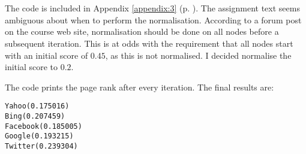 
\section{}

The code is included in Appendix \ref{appendix:3} (p. \pageref{appendix:3}).
The assignment text seems ambiguous about when to perform the normalisation.
According to a forum post on the course web site\footnotemark, normalisation
should be done on all nodes before a subsequent iteration. This is at odds with
the requirement that all nodes start with an initial score of $0.45$, as this
is not normalised. I decided normalise the initial score to $0.2$.


The code prints the page rank after every iteration. The final results are:

\begin{lstlisting}
Yahoo(0.175016)
Bing(0.207459)
Facebook(0.185005)
Google(0.193215)
Twitter(0.239304)
\end{lstlisting}

